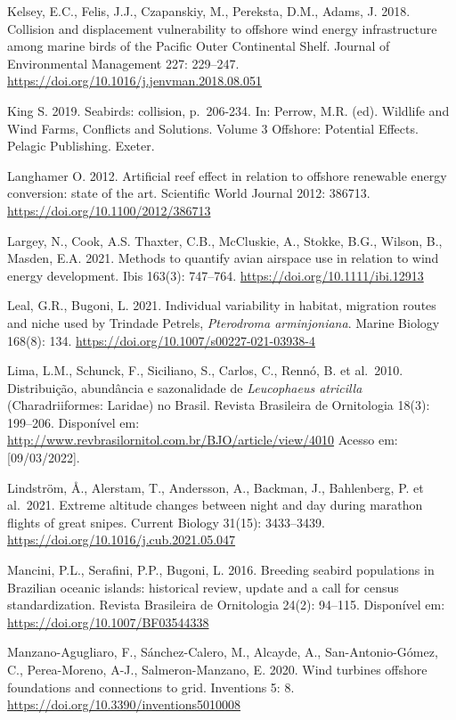 \documentclass[
  oneside]{scrbook}
\begin{document}
Kelsey, E.C., Felis, J.J., Czapanskiy, M., Pereksta, D.M., Adams, J. 2018. Collision and displacement vulnerability to offshore wind energy infrastructure among marine birds of the Pacific Outer Continental Shelf. Journal of Environmental Management 227: 229--247. \url{https://doi.org/10.1016/j.jenvman.2018.08.051}

King S. 2019. Seabirds: collision, p.~206-234. In: Perrow, M.R. (ed). Wildlife and Wind Farms, Conflicts and Solutions. Volume 3 Offshore: Potential Effects. Pelagic Publishing. Exeter.

Langhamer O. 2012. Artificial reef effect in relation to offshore renewable energy conversion: state of the art. Scientific World Journal 2012: 386713. \url{https://doi.org/10.1100/2012/386713}

Largey, N., Cook, A.S. Thaxter, C.B., McCluskie, A., Stokke, B.G., Wilson, B., Masden, E.A. 2021. Methods to quantify avian airspace use in relation to wind energy development. Ibis 163(3): 747--764. \url{https://doi.org/10.1111/ibi.12913}

Leal, G.R., Bugoni, L. 2021. Individual variability in habitat, migration routes and niche used by Trindade Petrels, \emph{Pterodroma arminjoniana}. Marine Biology 168(8): 134. \url{https://doi.org/10.1007/s00227-021-03938-4}

Lima, L.M., Schunck, F., Siciliano, S., Carlos, C., Rennó, B. et al.~2010. Distribuição, abundância e sazonalidade de \emph{Leucophaeus atricilla} (Charadriiformes: Laridae) no Brasil. Revista Brasileira de Ornitologia 18(3): 199--206. Disponível em: \url{http://www.revbrasilornitol.com.br/BJO/article/view/4010} Acesso em:{[}09/03/2022{]}.

Lindström, Å., Alerstam, T., Andersson, A., Backman, J., Bahlenberg, P. et al.~2021. Extreme altitude changes between night and day during marathon flights of great snipes. Current Biology 31(15): 3433--3439. \url{https://doi.org/10.1016/j.cub.2021.05.047}

Mancini, P.L., Serafini, P.P., Bugoni, L. 2016. Breeding seabird populations in Brazilian oceanic islands: historical review, update and a call for census standardization. Revista Brasileira de Ornitologia 24(2): 94--115. Disponível em: \url{https://doi.org/10.1007/BF03544338}

Manzano-Agugliaro, F., Sánchez-Calero, M., Alcayde, A., San-Antonio-Gómez, C., Perea-Moreno, A-J., Salmeron-Manzano, E. 2020. Wind turbines offshore foundations and connections to grid. Inventions 5: 8. \url{https://doi.org/10.3390/inventions5010008}
\end{document}
